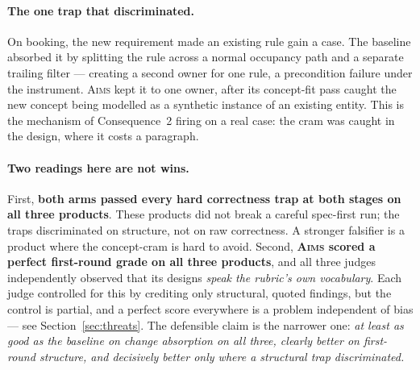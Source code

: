 \documentclass[11pt]{article}
\newcommand{\aims}{\textsc{Aims}}
\begin{document}
\paragraph{The one trap that discriminated.} On booking, the new requirement made an existing rule gain a case. The baseline absorbed it by splitting the rule across a normal occupancy path and a separate trailing filter --- creating a second owner for one rule, a precondition failure under the instrument. \aims{} kept it to one owner, after its concept-fit pass caught the new concept being modelled as a synthetic instance of an existing entity. This is the mechanism of Consequence~2 firing on a real case: the cram was caught in the design, where it costs a paragraph.

\paragraph{Two readings here are not wins.} First, \textbf{both arms passed every hard correctness trap at both stages on all three products}. These products did not break a careful spec-first run; the traps discriminated on structure, not on raw correctness. A stronger falsifier is a product where the concept-cram is hard to avoid. Second, \textbf{\aims{} scored a perfect first-round grade on all three products}, and all three judges independently observed that its designs \emph{speak the rubric's own vocabulary}. Each judge controlled for this by crediting only structural, quoted findings, but the control is partial, and a perfect score everywhere is a problem independent of bias --- see Section~\ref{sec:threats}. The defensible claim is the narrower one: \emph{at least as good as the baseline on change absorption on all three, clearly better on first-round structure, and decisively better only where a structural trap discriminated.}
\end{document}
